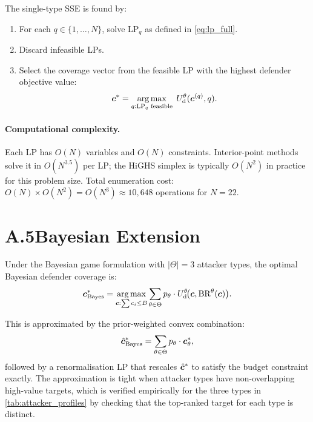 The single-type SSE is found by:
\begin{enumerate}
  \item For each $q \in \{1, \ldots, N\}$, solve LP$_q$ as defined
    in \cref{eq:lp_full}.
  \item Discard infeasible LPs.
  \item Select the coverage vector from the feasible LP with the
    highest defender objective value:
    \begin{equation}
      \bm{c}^* = \operatorname*{arg\,max}_{q: \text{LP}_q\text{ feasible}} \;
        U_{\mathrm{d}}^\theta(\bm{c}^{(q)}, q).
    \end{equation}
\end{enumerate}

\paragraph{Computational complexity.}
Each LP has $O(N)$ variables and $O(N)$ constraints.  Interior-point
methods solve it in $O(N^{3.5})$ per LP; the HiGHS simplex is typically
$O(N^2)$ in practice for this problem size.  Total enumeration cost:
$O(N) \times O(N^2) = O(N^3) \approx 10{,}648$ operations for $N = 22$.

\section*{A.5\quad Bayesian Extension}

Under the Bayesian game formulation with $|\Theta| = 3$ attacker types,
the optimal Bayesian defender coverage is:
\begin{equation}
  \bm{c}^*_\mathrm{Bayes} = \operatorname*{arg\,max}_{\bm{c}: \sum c_i \leq B}
    \sum_{\theta \in \Theta} p_\theta \cdot
    U_{\mathrm{d}}^\theta\!\bigl(\bm{c}, \mathrm{BR}^\theta(\bm{c})\bigr).
  \label{eq:bayesian_sse}
\end{equation}

This is approximated by the prior-weighted convex combination:
\begin{equation}
  \hat{\bm{c}}^*_\mathrm{Bayes} = \sum_{\theta \in \Theta} p_\theta \cdot \bm{c}^*_\theta,
  \label{eq:bayesian_approx}
\end{equation}
followed by a renormalisation LP that rescales $\hat{\bm{c}}^*$ to satisfy
the budget constraint exactly.  The approximation is tight when attacker
types have non-overlapping high-value targets, which is verified
empirically for the three types in \cref{tab:attacker_profiles} by
checking that the top-ranked target for each type is distinct.

